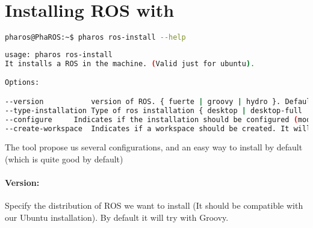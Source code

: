 \documentclass[a4paper,10pt,twoside]{book}
\begin{document}



\section{Installing ROS with \installationTool{}}


\begin{lstlisting}[language=bash,title={\installationTool{} for ROS installation}]
pharos@PhaROS:~$ pharos ros-install --help
\end{lstlisting}

\begin{lstlisting}[language=bash,title={\installationTool{} for ROS installation}]
usage: pharos ros-install 
It installs a ROS in the machine. (Valid just for ubuntu).

Options: 

--version			version of ROS. { fuerte | groovy | hydro }. Default: groovy.
--type-installation	Type of ros installation { desktop | desktop-full | ros-base }. Default: desktop.
--configure		Indicates if the installation should be configured (modifiy .bashrc file ).{true|false} Default: true.
--create-workspace	Indicates if a workspace should be created. It will create a workspace at ~/ros/worskpace. { true|false }. Default: true.

\end{lstlisting}


The tool propose us several configurations, and an easy way to install by default (which is quite good by default)

\paragraph{Version:} Specify the distribution of ROS we want to install (It should be compatible with our Ubuntu installation). By default it will try with Groovy.
\end{document}
